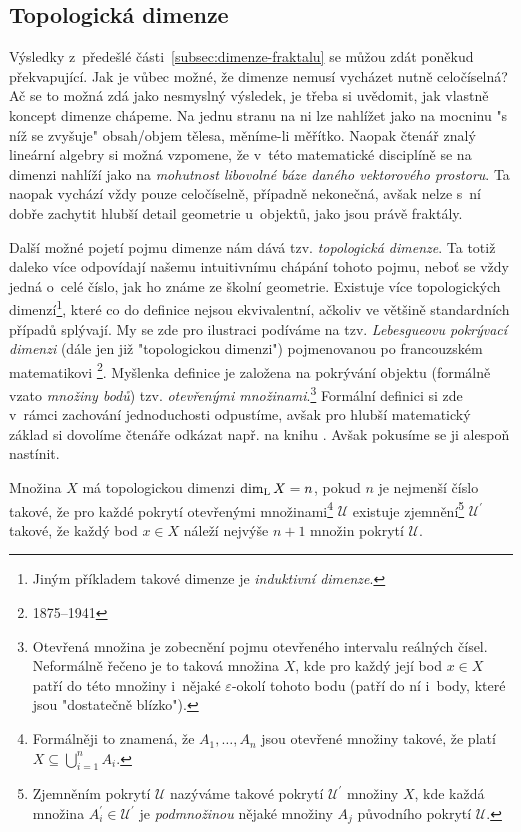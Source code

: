 \subsection{Topologická dimenze}\label{subsec:topologicka-dimenze}

Výsledky z~předešlé části~\ref{subsec:dimenze-fraktalu} se můžou zdát poněkud překvapující. Jak je vůbec možné, že dimenze nemusí vycházet nutně celočíselná? Ač se to možná zdá jako nesmyslný výsledek, je třeba si uvědomit, jak vlastně koncept dimenze chápeme. Na jednu stranu na ni lze nahlížet jako na mocninu "s níž se zvyšuje" obsah/objem tělesa, měníme-li měřítko. Naopak čtenář znalý lineární algebry si možná vzpomene, že v~této matematické disciplíně se na dimenzi nahlíží jako na \emph{mohutnost libovolné báze daného vektorového prostoru}. Ta naopak vychází vždy pouze celočíselně, případně nekonečná, avšak nelze s~ní dobře zachytit hlubší detail geometrie u~objektů, jako jsou právě fraktály.

Další možné pojetí pojmu dimenze nám dává tzv. \emph{topologická dimenze}. Ta totiž daleko více odpovídají našemu intuitivnímu chápání tohoto pojmu, neboť se vždy jedná o~celé číslo, jak ho známe ze školní geometrie. Existuje více topologických dimenzí\footnote{Jiným příkladem takové dimenze je \emph{induktivní dimenze}.}, které co do definice nejsou ekvivalentní, ačkoliv ve většině standardních případů splývají. My se zde pro ilustraci podíváme na tzv. \emph{Lebesgueovu pokrývací dimenzi} (dále jen již "topologickou dimenzi") pojmenovanou po francouzském matematikovi \footnote{1875--1941}. Myšlenka definice je založena na pokrývání objektu (formálně vzato \emph{množiny bodů}) tzv. \emph{otevřenými množinami}.\footnote{Otevřená množina je zobecnění pojmu otevřeného intervalu reálných čísel. Neformálně řečeno je to taková množina $X$, kde pro každý její bod $x\in X$ patří do této množiny i~nějaké $\varepsilon$-okolí tohoto bodu (patří do ní i~body, které jsou "dostatečně blízko").} Formální definici si zde v~rámci zachování jednoduchosti odpustíme, avšak pro hlubší matematický základ si dovolíme čtenáře odkázat např. na knihu \cite{Engelking1989}. Avšak pokusíme se ji alespoň nastínit.

Množina $X$ má topologickou dimenzi $\operatorname{dim_L}{X}=n$, pokud $n$ je nejmenší číslo takové, že pro každé pokrytí otevřenými množinami\footnote{Formálněji to znamená, že $A_1,\dots,A_n$ jsou otevřené množiny takové, že platí $X\subseteq\bigcup_{i=1}^n{A_i}$.} $\mathcal{U}$ existuje zjemnění\footnote{Zjemněním pokrytí $\mathcal{U}$ nazýváme takové pokrytí $\mathcal{U}^\prime$ množiny $X$, kde každá množina $A_i^\prime\in\mathcal{U}^\prime$ je \emph{podmnožinou} nějaké množiny $A_j$ původního pokrytí $\mathcal{U}$.} $\mathcal{U}^\prime$ takové, že každý bod $x\in X$ náleží nejvýše $n+1$ množin pokrytí $\mathcal{U}$.

